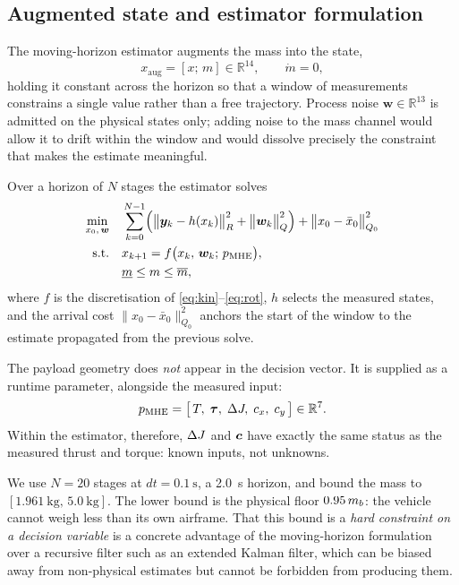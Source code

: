 \subsection{Augmented state and estimator formulation}\label{sec:model:mheform}

The moving-horizon estimator augments the mass into the state,
\begin{equation}
x_{\mathrm{aug}} = [x;\, m] \in \mathbb{R}^{14},
\qquad \dot m = 0,
\label{eq:xaug}
\end{equation}
holding it constant across the horizon so that a window of measurements
constrains a single value rather than a free trajectory. Process noise
$\bm{w} \in \mathbb{R}^{13}$ is admitted on the physical states only;
adding noise to the mass channel would allow it to drift within the
window and would dissolve precisely the constraint that makes the
estimate meaningful.

Over a horizon of $N$ stages the estimator solves
\begin{align}
\min_{x_0,\, \bm{w}} \quad
& \sum_{k=0}^{N-1} \Bigl( \bigl\| \bm{y}_k - h(x_k) \bigr\|^2_{R}
+ \bigl\| \bm{w}_k \bigr\|^2_{Q} \Bigr)
+ \bigl\| x_0 - \bar{x}_0 \bigr\|^2_{Q_0} \nonumber \\
\mathrm{s.t.} \quad
& x_{k+1} = f\bigl( x_k,\, \bm{w}_k;\, p_{\mathrm{MHE}} \bigr), \nonumber \\
& \underline{m} \le m \le \overline{m},
\label{eq:mhe}
\end{align}
where $f$ is the discretisation of \eqref{eq:kin}--\eqref{eq:rot},
$h$ selects the measured states, and the arrival cost
$\| x_0 - \bar{x}_0 \|^2_{Q_0}$ anchors the start of the window to the
estimate propagated from the previous solve.

The payload geometry does \emph{not} appear in the decision vector. It is
supplied as a runtime parameter, alongside the measured input:
\begin{equation}
p_{\mathrm{MHE}} = \bigl[\, T,\; \bm{\tau},\; \Delta J,\; c_x,\; c_y \,\bigr] \in \mathbb{R}^{7}.
\label{eq:pmhe}
\end{equation}
Within the estimator, therefore, $\Delta J$ and $\bm{c}$ have exactly the same
status as the measured thrust and torque: known inputs, not unknowns.

We use $N = 20$ stages at $dt = \SI{0.1}{\second}$, a \SI{2.0}{\second}
horizon, and bound the mass to
$[\SI{1.961}{\kg},\, \SI{5.0}{\kg}]$. The lower bound is the physical
floor $0.95\,m_b$: the vehicle cannot weigh less than its own airframe.
That this bound is a \emph{hard constraint on a decision variable} is a
concrete advantage of the moving-horizon formulation over a recursive
filter such as an extended Kalman filter, which can be biased away from
non-physical estimates but cannot be forbidden from producing them.

